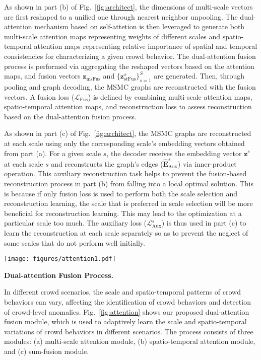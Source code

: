 \documentclass[journal]{IEEEtran}
\begin{document}
As shown in part (b) of Fig.~\ref{fig:architect}, the dimensions of multi-scale vectors are first reshaped to a unified one through nearest neighbor unpooling. The dual-attention mechanism based on self-attetion is then leveraged to generate both multi-scale attention maps representing weights of different scales and spatio-temporal attention maps representing  relative importance of spatial and temporal consistencies for characterizing a given crowd behavior. The dual-attention fusion process is performed via aggregating the reshaped vectors based on the attention maps, and fusion vectors $\mathbf{z}_{\mathrm{msFus}}^{}$ and $ \{  \mathbf{z}_{\mathrm{stFus}}^s\}_{s=1}^{S} $ are generated. Then, through pooling and graph decoding, the MSMC graphs are reconstructed with the fusion vectors. A fusion loss ($\mathcal{L}_{\mathrm{Fus}}$) is defined by combining multi-scale attention maps, spatio-temporal attention maps, and reconstruction loss to assess reconstruction based on the dual-attention fusion process.

As shown in part (c) of Fig.~\ref{fig:architect}, the MSMC graphs are reconstructed at each scale using only the corresponding scale's embedding vectors obtained from part (a). For a given scale $s$, the decoder receives the embedding vector $\mathbf{z}^s$ at each scale $s$ and reconstructs the graph's edges ($\hat{\mathbf{E}}^s_{\mathrm{Aux}}$) via inner-product operation. This auxiliary reconstruction task helps to prevent the fusion-based reconstruction process in part (b) from falling into a local optimal solution. This is because if only fusion loss is used to perform both the scale selection and reconstruction learning, the scale that is preferred in scale selection will be more beneficial for reconstruction learning. This may lead to the optimization at a particular scale too much. The auxiliary loss ($\mathcal{L}_{\mathrm{Aux}}^{s}$) is thus used in part (c) to learn the reconstruction at each scale separately so as to prevent the neglect of some scales that do not perform well initially.

\vskip 0.03in

\begin{figure*}[t]
\centering
\texttt{[image: figures/attention1.pdf]}
\caption{
Detailed design of dual-attention fusion process.
}\label{fig:attention}
\end{figure*}

\noindent
\textbf{Dual-attention Fusion Process.}

In different crowd scenarios, the scale and spatio-temporal patterns of crowd behaviors can vary, affecting the identification of crowd behaviors and detection of crowd-level anomalies. Fig.~\ref{fig:attention} shows our proposed dual-attention fusion module, which is used to adaptively learn the scale and spatio-temporal variations of crowd behaviors in different scenarios. The process consists of three modules: (a) multi-scale attention module, (b) spatio-temporal attention module, and (c) sum-fusion module.
\end{document}
